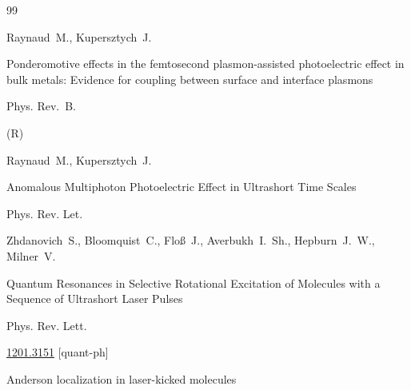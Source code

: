 \begin{thebibliography}{99}





\by Raynaud~M., Kupersztych~J. 

\paper Ponderomotive effects in the femtosecond plasmon-assisted photoelectric effect in bulk metals: Evidence for coupling between surface and interface plasmons 

\jour Phys. Rev.~B. 




(R)





\by Raynaud~M., Kupersztych~J.

\paper Anomalous Multiphoton Photoelectric Effect in Ultrashort Time Scales 

\jour Phys. Rev. Let. 









\by Zhdanovich~S., Bloomquist~C., Flo\ss~J.,  Averbukh~I.~Sh., Hepburn~J.~W., Milner~V.

\paper Quantum Resonances in Selective Rotational Excitation of Molecules with a Sequence of Ultrashort Laser Pulses 

\jour Phys. Rev. Lett.





\arxiv \href{http://arxiv.org/abs/1201.3151}{1201.3151} [quant-ph]





\paper Anderson localization in laser-kicked molecules 


\end{thebibliography}
